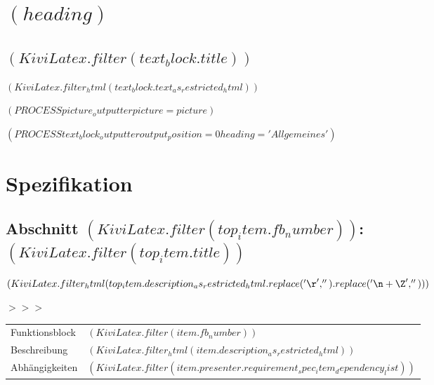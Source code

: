 \documentclass{scrartcl}
\begin{document}

  \newpage

  \section{$( heading )$}


    \subsection{$( KiviLatex.filter(text_block.title) )$}

$( KiviLatex.filter_html(text_block.text_as_restricted_html) )$

$( PROCESS picture_outputter picture=picture )$


$( PROCESS text_block_outputter output_position=0 heading='Allgemeines' )$

\newpage

\section{Spezifikation}

\setlength{\LTpre}{-0.3cm}



  \subsection{Abschnitt $( KiviLatex.filter(top_item.fb_number) )$: $( KiviLatex.filter(top_item.title) )$}

    $( KiviLatex.filter_html(top_item.description_as_restricted_html.replace('\r', '').replace('\n+\Z', '')) )$

    \vspace{0.5cm}
\parbox[t]{1.0cm}{\textcolor{kivitendodarkred}{$>>>$}}%
\parbox[t]{15.0cm}{%
\begin{longtable}{p{2.8cm}p{11.7cm}}
  Funktionsblock & $( KiviLatex.filter(item.fb_number) )$\\
  Beschreibung & $( KiviLatex.filter_html(item.description_as_restricted_html) )$\\
  Abhängigkeiten & $( KiviLatex.filter(item.presenter.requirement_spec_item_dependency_list) )$
\end{longtable}}
\end{document}
